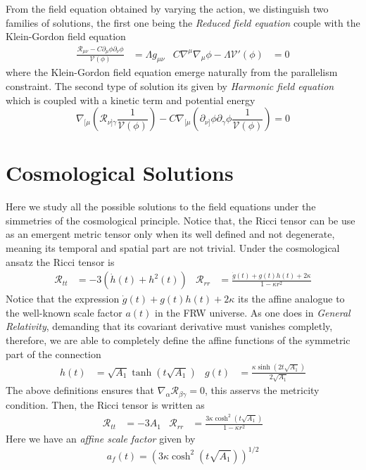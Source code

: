 \documentclass[10pt,a4paper]{article}
\begin{document}
From the field equation obtained by varying the action, we distinguish two families of solutions, the first one being the
\textit{Reduced field equation} couple with the Klein-Gordon field equation
\begin{align}
  \frac{\mathcal{R}_{\mu\nu} - C\partial_\mu \phi \partial_\nu \phi}{\mathcal{V}(\phi)} & = \Lambda g_{\mu\nu} & 
  C \nabla^\mu \nabla_\mu \phi - \Lambda \mathcal{V}'(\phi) & = 0
\end{align}
where the Klein-Gordon field equation emerge naturally from the parallelism constraint. The second type of solution its given by
\textit{Harmonic field equation} which is coupled with a kinetic term and potential energy
\begin{equation}
  \nabla_{[\mu}\left(\mathcal{R}_{\nu]\gamma}\frac{1}{\mathcal{V}(\phi)}\right) 
  - C \nabla_{[\mu}\left(\partial_{\nu]} \phi \partial_\gamma \phi \frac{1}{\mathcal{V}(\phi)}\right) = 0
\end{equation}





\section{Cosmological Solutions}

Here we study all the possible solutions to the field equations under the simmetries of the cosmological principle. Notice that, the 
Ricci tensor can be use as an emergent metric tensor only when its well defined and not degenerate, meaning its temporal and spatial
part are not trivial. Under the cosmological ansatz the Ricci tensor is 
\begin{align}
  \mathcal{R}_{tt} & = -3\left(\dot{h}(t) + h^2(t)\right) & \mathcal{R}_{rr} & = \frac{\dot{g}(t) + g(t)h(t) + 2\kappa}{1 - \kappa r^2}
\end{align}
Notice that the expression $\dot{g}(t) + g(t)h(t) + 2\kappa$ its the affine analogue to the well-known scale factor $a(t)$ in the FRW universe. As 
one does in \textit{General Relativity}, demanding that its covariant derivative must vanishes completly, therefore, we are able 
to completely define the affine functions of the symmetric part of the connection
\begin{align}
  h(t) & = \sqrt{A_1}\tanh\left(t\sqrt{A_1}\right) & g(t) & = \frac{\kappa \sinh\left(2t\sqrt{A_1}\right) }{2\sqrt{A_1}}
\end{align}
The above definitions ensures that $\nabla_\alpha \mathcal{R}_{\beta\gamma} = 0$, this asservs the metricity condition. Then, the Ricci tensor
is written as
\begin{align}
  \mathcal{R}_{tt} & = -3A_1 & \mathcal{R}_{rr} & =  \frac{3\kappa \cosh^2(t\sqrt{A_1})}{1 - \kappa r^2}
\end{align}
Here we have an \textit{affine scale factor} given by 
\begin{equation}
  a_f(t) = \left(3\kappa \cosh^2(t\sqrt{A_1})\right)^{1/2}
\end{equation}
\end{document}

